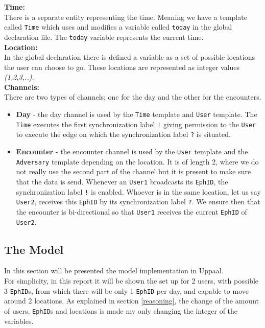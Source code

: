 \documentclass[a4paper, twocolumn]{article}
\begin{document}
\noindent \textbf{Time:}\\
There is a separate entity representing the time. Meaning we have a template called \texttt{Time} which uses and modifies a variable called \texttt{today} in the global declaration file. The \texttt{today} variable represents the current time.\\

\noindent \textbf{Location:}\\
In the global declaration there is defined a variable as a set of possible locations the user can choose to go. These locations are represented as integer values \textit{(1,2,3,..)}.\\

\noindent \textbf{Channels:}\\
There are two types of channels; one for the day and the other for the encounters.
\begin{itemize}
    \item \textbf{Day} - the day channel is used by the \texttt{Time} template and \texttt{User} template. The \texttt{Time} executes the first synchronization label \texttt{!} giving permission to the \texttt{User} to execute the edge on which the synchronization label \texttt{?} is situated.
    \item \textbf{Encounter} - the encounter channel is used by the \texttt{User} template and the \texttt{Adversary} template depending on the location. It is of length 2, where we do not really use the second part of the channel but it is present to make sure that the data is send. Whenever an \texttt{User1} broadcasts its \texttt{EphID}, the synchronization label \texttt{!} is enabled. Whoever is in the same location, let us say \texttt{User2}, receives this \texttt{EphID} by its synchronization label \texttt{?}. We ensure then that the encounter is bi-directional so that \texttt{User1} receives the current \texttt{EphID} of \texttt{User2}.
\end{itemize}
\subsection{The Model}
In this section will be presented the model implementation in Uppaal.\\
For simplicity, in this report it will be shown the set up for 2 users, with possible 3 \texttt{EphID}s, from which there will be only 1 \texttt{EphID} per day, and capable to move around 2 locations. As explained in section \ref{reasoning}, the change of the amount of users, \texttt{EphID}s and locations is made my only changing the integer of the variables.
\end{document}
